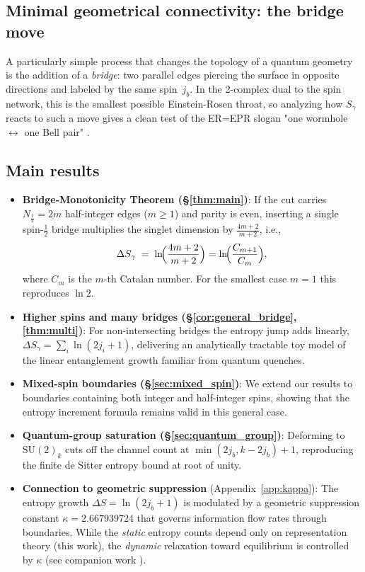 \documentclass[11pt, a4paper]{article}
\theoremstyle{plain}
\theoremstyle{definition}
\theoremstyle{remark}
\newcommand{\SU}{\mathrm{SU}}
\begin{document}
\subsection{Minimal geometrical connectivity: the bridge move}

A particularly simple process that changes the topology of a quantum geometry is the addition of a \emph{bridge}: two parallel edges piercing the surface in opposite directions and labeled by the same spin~$j_b$. In the 2-complex dual to the spin network, this is the smallest possible Einstein-Rosen throat, so analyzing how $S_{\gamma}$ reacts to such a move gives a clean test of the ER=EPR slogan "one wormhole $\leftrightarrow$ one Bell pair" \cite{MaldacenaSusskind2013}.

\subsection{Main results}

\begin{itemize}\setlength\itemsep{4pt}
  \item \textbf{Bridge-Monotonicity Theorem (\S\ref{thm:main})}:
    If the cut carries $N_{\tfrac12}=2m$ half-integer edges
    ($m\!\ge\!1$) and parity is even, inserting a single
    spin-$\tfrac12$ bridge multiplies the singlet dimension by
    $\tfrac{4m+2}{m+2}$, i.e.,
    \[        \Delta S_{\gamma}          \;=\;\ln\!\Bigl(\frac{4m+2}{m+2}\Bigr)          =\ln\!\Bigl(\frac{C_{m+1}}{C_m}\Bigr),      \]
    where $C_m$ is the $m$-th Catalan number.
    For the smallest case $m=1$ this reproduces $\ln2$.
  \item \textbf{Higher spins and many bridges
    (\S\ref{cor:general_bridge}, \ref{thm:multi})}: For
    non-intersecting bridges the entropy jump adds linearly,
    $\Delta S_{\gamma} = \sum_i \ln(2j_i+1)$, delivering an analytically
    tractable toy model of the linear entanglement growth familiar
    from quantum quenches.
  \item \textbf{Mixed-spin boundaries (\S\ref{sec:mixed_spin})}: We extend our results to boundaries containing both integer and half-integer spins, showing that the entropy increment formula remains valid in this general case.
  \item \textbf{Quantum-group saturation
    (\S\ref{sec:quantum_group})}: Deforming to
    $\SU(2)_k$ cuts off the channel count at
    $\min(2j_b,k-2j_b)+1$, reproducing the finite de Sitter entropy
    bound at root of unity.
  \item \textbf{Connection to geometric suppression} (Appendix~\ref{app:kappa}): The entropy growth $\Delta S = \ln(2j_b + 1)$ is modulated by a geometric suppression constant $\kappa = 2.667939724$ that governs information flow rates through boundaries. While the \emph{static} entropy counts depend only on representation theory (this work), the \emph{dynamic} relaxation toward equilibrium is controlled by $\kappa$ (see companion work \cite{SandozOperatorAlgebraic2025}).
\end{itemize}
\end{document}
